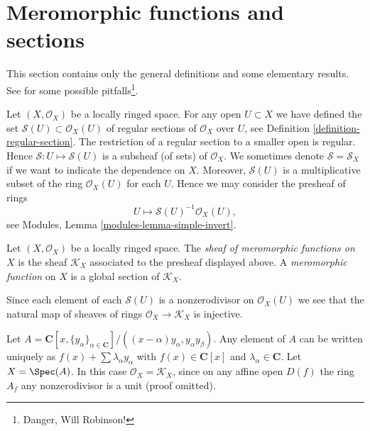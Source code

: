 










\section{Meromorphic functions and sections}
\label{section-meromorphic-functions}

\noindent
This section contains only the general definitions and some elementary results.
See \cite{misconceptions} for some possible
pitfalls\footnote{Danger, Will Robinson!}.

\medskip\noindent
Let $(X, \mathcal{O}_X)$ be a locally ringed space.
For any open $U \subset X$ we have defined the set
$\mathcal{S}(U) \subset \mathcal{O}_X(U)$
of regular sections of $\mathcal{O}_X$ over $U$, see
Definition \ref{definition-regular-section}. The restriction
of a regular section to a smaller open is regular. Hence
$\mathcal{S} : U \mapsto \mathcal{S}(U)$ is a subsheaf (of sets)
of $\mathcal{O}_X$. We sometimes denote $\mathcal{S} = \mathcal{S}_X$
if we want to indicate the dependence on $X$.
Moreover, $\mathcal{S}(U)$
is a multiplicative subset of the ring $\mathcal{O}_X(U)$ for
each $U$. Hence we may consider
the presheaf of rings
$$
U \longmapsto \mathcal{S}(U)^{-1} \mathcal{O}_X(U),
$$
see Modules, Lemma \ref{modules-lemma-simple-invert}.

\begin{definition}
\label{definition-sheaf-meromorphic-functions}
Let $(X, \mathcal{O}_X)$ be a locally ringed space.
The {\it sheaf of meromorphic functions on $X$} is
the sheaf {\it $\mathcal{K}_X$} associated to the presheaf
displayed above. A {\it meromorphic function} on $X$
is a global section of $\mathcal{K}_X$.
\end{definition}

\noindent
Since each element of each $\mathcal{S}(U)$ is a nonzerodivisor on
$\mathcal{O}_X(U)$ we see that the natural map of sheaves
of rings $\mathcal{O}_X \to \mathcal{K}_X$ is injective.

\begin{example}
\label{example-no-change}
Let $A = \mathbf{C}[x, \{y_\alpha\}_{\alpha \in \mathbf{C}}]/
((x - \alpha)y_\alpha, y_\alpha y_\beta)$. Any element of $A$
can be written uniquely as
$f(x) + \sum \lambda_\alpha y_\alpha$ with $f(x) \in \mathbf{C}[x]$
and $\lambda_\alpha \in \mathbf{C}$.
Let $X = \Spec(A)$.
In this case $\mathcal{O}_X = \mathcal{K}_X$, since on
any affine open $D(f)$ the ring $A_f$ any nonzerodivisor is
a unit (proof omitted).
\end{example}


